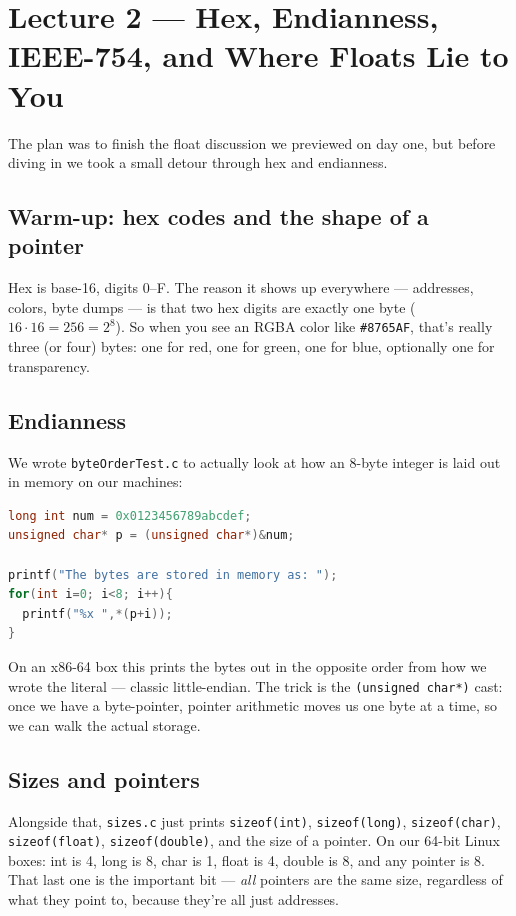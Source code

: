 \documentclass[11pt]{article}
\begin{document}
\section{Lecture 2 --- Hex, Endianness, IEEE-754, and Where Floats Lie to You}

The plan was to finish the float discussion we previewed on day one,
but before diving in we took a small detour through hex and
endianness.

\subsection*{Warm-up: hex codes and the shape of a pointer}

Hex is base-16, digits 0--F. The reason it shows up everywhere ---
addresses, colors, byte dumps --- is that two hex digits are exactly
one byte ($16 \cdot 16 = 256 = 2^8$). So when you see an RGBA color
like \texttt{\#8765AF}, that's really three (or four) bytes: one for
red, one for green, one for blue, optionally one for transparency.

\subsection*{Endianness}

We wrote \texttt{byteOrderTest.c} to actually look at how an 8-byte
integer is laid out in memory on our machines:

\begin{lstlisting}[language=C]
long int num = 0x0123456789abcdef;
unsigned char* p = (unsigned char*)&num;

printf("The bytes are stored in memory as: ");
for(int i=0; i<8; i++){
  printf("%x ",*(p+i));
}
\end{lstlisting}

On an x86-64 box this prints the bytes out in the opposite order from
how we wrote the literal --- classic little-endian. The trick is the
\texttt{(unsigned char*)} cast: once we have a byte-pointer, pointer
arithmetic moves us one byte at a time, so we can walk the actual
storage.

\subsection*{Sizes and pointers}

Alongside that, \texttt{sizes.c} just prints \texttt{sizeof(int)},
\texttt{sizeof(long)}, \texttt{sizeof(char)}, \texttt{sizeof(float)},
\texttt{sizeof(double)}, and the size of a pointer. On our 64-bit
Linux boxes: int is 4, long is 8, char is 1, float is 4, double is 8,
and any pointer is 8. That last one is the important bit ---
\emph{all} pointers are the same size, regardless of what they point
to, because they're all just addresses.
\end{document}
